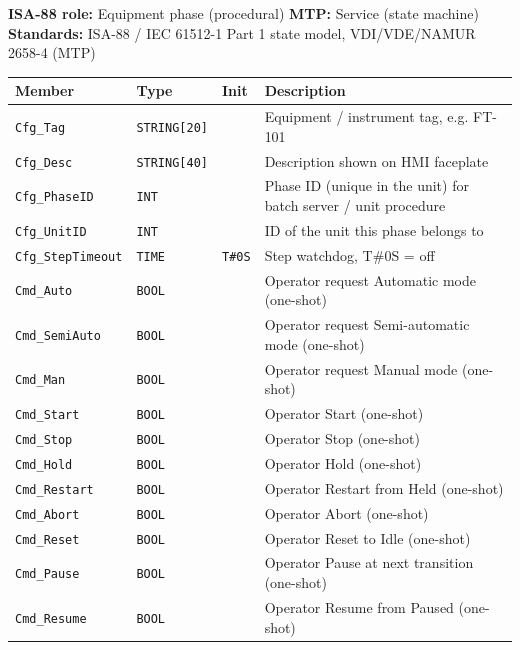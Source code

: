 {\small\textbf{ISA-88 role:} Equipment phase (procedural) \quad \textbf{MTP:} Service (state machine) \quad \textbf{Standards:} ISA-88 /\allowbreak{} IEC 61512-1 Part 1 state model, VDI/\allowbreak{}VDE/\allowbreak{}NAMUR 2658-4 (MTP)}
{\footnotesize
\begin{longtable}{@{}>{\raggedright\arraybackslash}p{3.4cm}>{\raggedright\arraybackslash}p{3.3cm}>{\raggedright\arraybackslash}p{1.3cm}>{\raggedright\arraybackslash}p{6.4cm}@{}}
\toprule
\rowcolor{tblhead}\textbf{Member} & \textbf{Type} & \textbf{Init} & \textbf{Description} \\
\midrule
\endhead
\texttt{Cfg\_Tag} & \texttt{STRING[20]} &  & Equipment /\allowbreak{} instrument tag, e.g. FT-101 \\
\texttt{Cfg\_Desc} & \texttt{STRING[40]} &  & Description shown on HMI faceplate \\
\texttt{Cfg\_PhaseID} & \texttt{INT} &  & Phase ID (unique in the unit) for batch server /\allowbreak{} unit procedure \\
\texttt{Cfg\_UnitID} & \texttt{INT} &  & ID of the unit this phase belongs to \\
\texttt{Cfg\_StepTimeout} & \texttt{TIME} & \texttt{T\#0S} & Step watchdog, T\#0S = off \\
\texttt{Cmd\_Auto} & \texttt{BOOL} &  & Operator request Automatic mode (one-shot) \\
\texttt{Cmd\_SemiAuto} & \texttt{BOOL} &  & Operator request Semi-automatic mode (one-shot) \\
\texttt{Cmd\_Man} & \texttt{BOOL} &  & Operator request Manual mode (one-shot) \\
\texttt{Cmd\_Start} & \texttt{BOOL} &  & Operator Start (one-shot) \\
\texttt{Cmd\_Stop} & \texttt{BOOL} &  & Operator Stop (one-shot) \\
\texttt{Cmd\_Hold} & \texttt{BOOL} &  & Operator Hold (one-shot) \\
\texttt{Cmd\_Restart} & \texttt{BOOL} &  & Operator Restart from Held (one-shot) \\
\texttt{Cmd\_Abort} & \texttt{BOOL} &  & Operator Abort (one-shot) \\
\texttt{Cmd\_Reset} & \texttt{BOOL} &  & Operator Reset to Idle (one-shot) \\
\texttt{Cmd\_Pause} & \texttt{BOOL} &  & Operator Pause at next transition (one-shot) \\
\texttt{Cmd\_Resume} & \texttt{BOOL} &  & Operator Resume from Paused (one-shot) \\

\end{longtable}}
